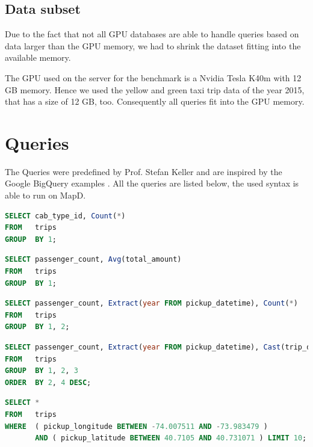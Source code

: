 \subsection{Data subset}
Due to the fact that not all GPU databases are able to handle queries based on data larger than the GPU memory,
we had to shrink the dataset fitting into the available memory.

The GPU used on the server for the benchmark is a Nvidia Tesla K40m with 12 GB memory.
Hence we used the yellow and green taxi trip data of the year 2015, that has a size of 12 GB, too.
Consequently all queries fit into the GPU memory.


\newpage
\section{Queries}
\label{sec:queries}
The Queries were predefined by Prof. Stefan Keller and are inspired by the Google BigQuery examples \cite{bigquery}.
All the queries are listed below, the used syntax is able to run on MapD. \\


\begin{lstlisting}[language=sql, caption={Query 1, Counts all the yellow taxi trips},captionpos=b]
SELECT cab_type_id, Count(*)
FROM   trips
GROUP  BY 1;
\end{lstlisting}


\begin{lstlisting}[language=sql, caption={Query 2, Calculates the average passenger amount per trip},captionpos=b]
SELECT passenger_count, Avg(total_amount)
FROM   trips
GROUP  BY 1;
\end{lstlisting}

\begin{lstlisting}[language=sql, caption={Query 3, Sums the yearly amount of passengers},captionpos=b]
SELECT passenger_count, Extract(year FROM pickup_datetime), Count(*)
FROM   trips
GROUP  BY 1, 2;
\end{lstlisting}


\begin{lstlisting}[language=sql, caption={Query 4, Groups the amount of passenger by year regarding the trip distance},captionpos=b]
SELECT passenger_count, Extract(year FROM pickup_datetime), Cast(trip_distance AS INT), Count(*)
FROM   trips
GROUP  BY 1, 2, 3
ORDER  BY 2, 4 DESC;
\end{lstlisting}

\begin{lstlisting}[language=sql, caption={Query 5, Queries all trips in a certain bounding box},captionpos=b]
SELECT *
FROM   trips
WHERE  ( pickup_longitude BETWEEN -74.007511 AND -73.983479 )
       AND ( pickup_latitude BETWEEN 40.7105 AND 40.731071 ) LIMIT 10;
\end{lstlisting}


